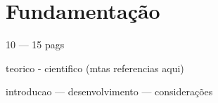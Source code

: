 
\chapter{Fundamentação}
10 --- 15 pags

teorico - cientifico (mtas referencias aqui)

introducao --- desenvolvimento --- considerações
